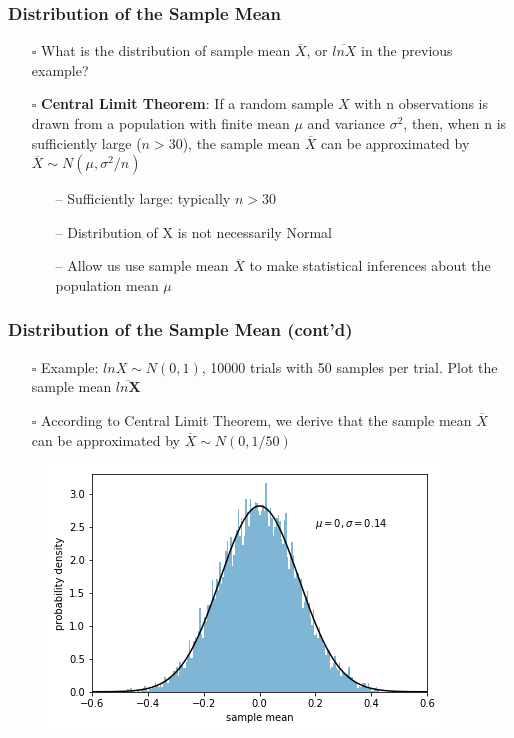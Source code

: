 \documentclass[handout]{beamer}
\begin{document}
\begin{frame}
    \frametitle{Distribution of the Sample Mean}
    \begin{itemize}[wide = 0pt]
        \item[$\square$] What is the distribution of sample mean $\overline{X}$, or $\overline{lnX}$ in the previous example?
        \vspace{8pt}
        \item[$\square$] \textbf{\color{red}Central Limit Theorem}: If a random sample $X$ with n observations is drawn from a population with finite mean $\mu$ and variance $\sigma^2$, then, when n is {\color{red}sufficiently large} ($n > 30$), the sample mean $\overline{X}$ can be approximated by {\color{red}$\overline{X}\sim N(\mu,\sigma^2/n)$}
        \begin{itemize}
            \item[--] Sufficiently large: typically $n > 30$
            \item[--] Distribution of X is not necessarily Normal
            \item[--] Allow us use sample mean $\overline{X}$ to make statistical inferences about the population mean $\mu$
        \end{itemize}
    \end{itemize}
    \vspace*{\fill}
\end{frame}

\begin{frame}
    \frametitle{Distribution of the Sample Mean (cont'd)}
    \begin{itemize}[wide = 0pt]
        \item[$\square$] Example: $lnX\sim N(0,1)$, 10000 trials with 50 samples per trial. Plot the sample mean $\overline{ln\textbf{X}}$
        \item[$\square$] According to Central Limit Theorem, we derive that the sample mean $\overline{X}$ can be approximated by $\overline{X}\sim N(0, 1/50)$
    \end{itemize}
    \begin{figure}
        \centering
		\includegraphics[width=.6\textwidth]{lognormal.png}
	\end{figure}
	\vspace*{\fill}
\end{frame}
\end{document}
